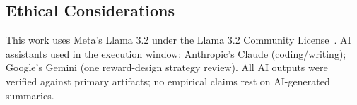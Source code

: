 \subsection{Ethical Considerations}
This work uses Meta's Llama 3.2 under the Llama 3.2 Community License~\citep{meta2024llama3_2_aup}. AI assistants used in the execution window: Anthropic's Claude (coding/writing); Google's Gemini (one reward-design strategy review). All AI outputs were verified against primary artifacts; no empirical claims rest on AI-generated summaries.

